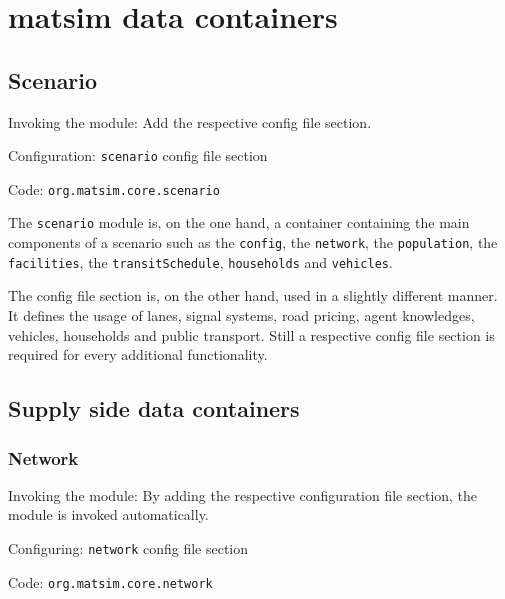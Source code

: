 \section{\acrshort{matsim} data containers}
\label{sec:matsim-containers}

\subsection{Scenario}
\label{sec:scenario}
\begin{compactitem}
\item Invoking the module: Add the respective config file section.
\item Configuration: \lstinline|scenario| config file section 
\item Code: \lstinline|org.matsim.core.scenario|
\end{compactitem}

The \lstinline|scenario| module is, on the one hand, a container containing the main components of a scenario such as the \lstinline|config|, the \lstinline|network|, the \lstinline|population|, the \lstinline|facilities|, the \lstinline|transitSchedule|, \lstinline|households| and \lstinline|vehicles|.

The config file section is, on the other hand, used in a slightly different manner. It defines the usage of lanes, signal systems, road pricing, agent knowledges, vehicles, households and public transport. Still a respective config file section is required for every additional functionality. 

\subsection{Supply side data containers}
\label{sec:supplysidemodules}
\subsubsection{Network}
\label{sec:network}
\begin{compactitem}
\item Invoking the module: By adding the respective configuration file section, the module is invoked automatically.
\item Configuring: \lstinline|network| config file section
\item Code: \lstinline|org.matsim.core.network|
\end{compactitem}

